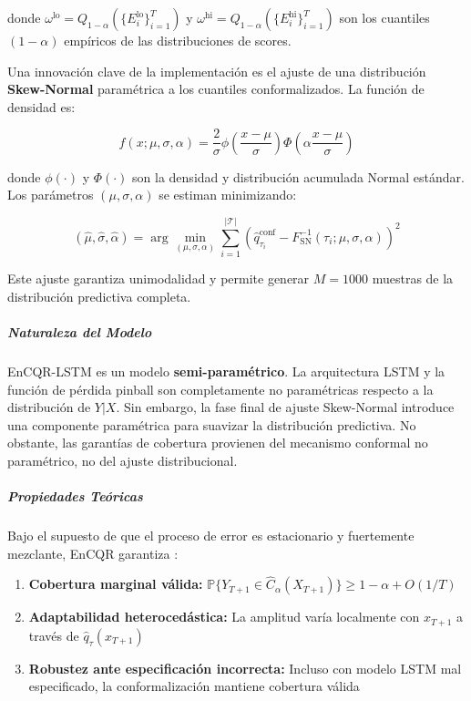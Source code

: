 donde $\omega^{\text{lo}} = Q_{1-\alpha}(\{E_i^{\text{lo}}\}_{i=1}^{T})$ y $\omega^{\text{hi}} = Q_{1-\alpha}(\{E_i^{\text{hi}}\}_{i=1}^{T})$ son los cuantiles $(1-\alpha)$ empíricos de las distribuciones de scores.

Una innovación clave de la implementación es el ajuste de una distribución \textbf{Skew-Normal} paramétrica a los cuantiles conformalizados. La función de densidad es:

\begin{equation}
f(x; \mu, \sigma, \alpha) = \frac{2}{\sigma} \phi\left(\frac{x - \mu}{\sigma}\right) \Phi\left(\alpha \frac{x - \mu}{\sigma}\right)
\end{equation}

donde $\phi(\cdot)$ y $\Phi(\cdot)$ son la densidad y distribución acumulada Normal estándar. Los parámetros $(\mu, \sigma, \alpha)$ se estiman minimizando:

\begin{equation}
(\hat{\mu}, \hat{\sigma}, \hat{\alpha}) = \arg\min_{(\mu, \sigma, \alpha)} \sum_{i=1}^{|\mathcal{T}|} \left(\hat{q}_{\tau_i}^{\text{conf}} - F^{-1}_{\text{SN}}(\tau_i; \mu, \sigma, \alpha)\right)^2
\end{equation}

Este ajuste garantiza unimodalidad y permite generar $M = 1000$ muestras de la distribución predictiva completa.

\subparagraph{Naturaleza del Modelo}

EnCQR-LSTM es un modelo \textbf{semi-paramétrico}. La arquitectura LSTM y la función de pérdida pinball son completamente no paramétricas respecto a la distribución de $Y|X$. Sin embargo, la fase final de ajuste Skew-Normal introduce una componente paramétrica para suavizar la distribución predictiva. No obstante, las garantías de cobertura provienen del mecanismo conformal no paramétrico, no del ajuste distribucional.

\subparagraph{Propiedades Teóricas}

Bajo el supuesto de que el proceso de error es estacionario y fuertemente mezclante, EnCQR garantiza \parencite{Jensen2022}:

\begin{enumerate}
\item \textbf{Cobertura marginal válida:} $\mathbb{P}\{Y_{T+1} \in \hat{C}_{\alpha}(X_{T+1})\} \geq 1 - \alpha + O(1/T)$
\item \textbf{Adaptabilidad heterocedástica:} La amplitud varía localmente con $x_{T+1}$ a través de $\hat{q}_{\tau}(x_{T+1})$
\item \textbf{Robustez ante especificación incorrecta:} Incluso con modelo LSTM mal especificado, la conformalización mantiene cobertura válida
\end{enumerate}

